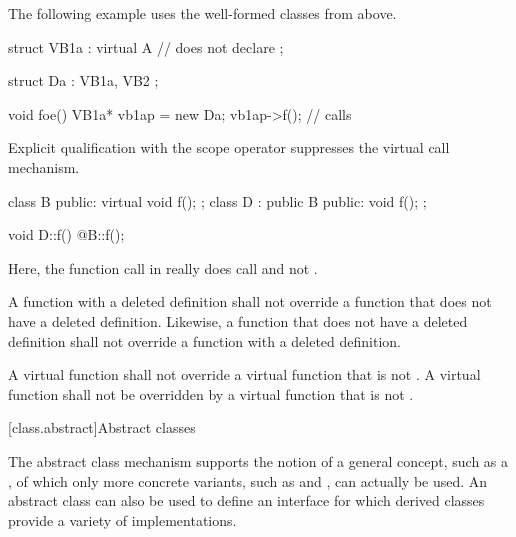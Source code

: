 \pnum
\begin{example}
The following example uses the well-formed classes from above.
\begin{codeblock}
struct VB1a : virtual A {       // does not declare 
};

struct Da : VB1a, VB2 {
};

void foe() {
  VB1a*  vb1ap = new Da;
  vb1ap->f();                   // calls 
}
\end{codeblock}
\end{example}

\pnum
{}%
%
Explicit qualification with the scope operator
suppresses the virtual call mechanism.
\begin{example}
\begin{codeblock}
class B { public: virtual void f(); };
class D : public B { public: void f(); };

void D::f() { @\commentellip@ B::f(); }
\end{codeblock}

Here, the function call in
really does call
and not
.
\end{example}

\pnum
A function with a deleted definition shall
not override a function that does not have a deleted definition. Likewise,
a function that does not have a deleted definition shall not override a
function with a deleted definition.%

\pnum
A  virtual function shall not override
a virtual function that is not .
A  virtual function shall not be overridden by
a virtual function that is not .

[class.abstract]{Abstract classes}%

\pnum
\begin{note}
The abstract class mechanism supports the notion of a general concept,
such as a , of which only more concrete variants, such as
 and , can actually be used. An abstract
class can also be used to define an interface for which derived classes
provide a variety of implementations.
\end{note}

